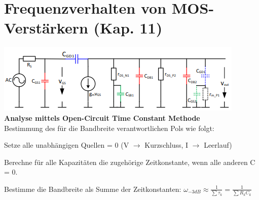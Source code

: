 
\section{Frequenzverhalten von MOS-Verstärkern (Kap. 11)}
\includegraphics[width=0.5\linewidth]{chapters/Frequenzverhalten/images/parasitaere_kapazitaeten}
\textbf{Analyse mittels Open-Circuit Time Constant Methode} \\
Bestimmung des für die Bandbreite verantwortlichen Pols wie folgt:
\begin{compactenum}
	\item Setze alle unabhängigen Quellen = 0 (V $\rightarrow$ Kurzschluss, I $\rightarrow$ Leerlauf)
	\item Berechne für alle Kapazitäten die zugehörige Zeitkonstante, wenn alle anderen C = 0.
	\item Bestimme die Bandbreite als Summe der Zeitkonstanten: $\omega_{-3dB}\approx \frac{1}{\sum\tau_k}=\frac{1}{\sum R_kC_k}$
\end{compactenum}

